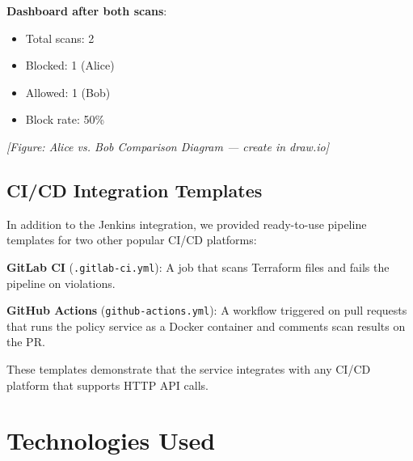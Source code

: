 \vspace{0.3cm}
\noindent\textbf{Dashboard after both scans}:
\begin{itemize}
    \item Total scans: 2
    \item Blocked: 1 (Alice)
    \item Allowed: 1 (Bob)
    \item Block rate: 50\%
\end{itemize}


\textit{[Figure: Alice vs. Bob Comparison Diagram — create in draw.io]}

\subsection{CI/CD Integration Templates}

In addition to the Jenkins integration, we provided ready-to-use pipeline templates for two other popular CI/CD platforms:

\vspace{0.3cm}
\noindent\textbf{GitLab CI} (\texttt{.gitlab-ci.yml}): A job that scans Terraform files and fails the pipeline on violations.

\noindent\textbf{GitHub Actions} (\texttt{github-actions.yml}): A workflow triggered on pull requests that runs the policy service as a Docker container and comments scan results on the PR.

These templates demonstrate that the service integrates with any CI/CD platform that supports HTTP API calls.

\section{Technologies Used}

